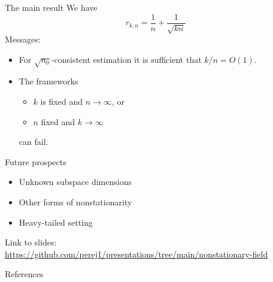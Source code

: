 \documentclass{beamer}
\begin{document}
\begin{frame}{The main result}
  We have
  \begin{equation*}
    r_{k,n} = \frac{1}{n} + \frac{1}{\sqrt{kn}}
  \end{equation*}
  \pause
  Messages:
  \begin{itemize}
    \item For $\sqrt{n_0}$-consistent estimation it is sufficient that
    $k/n=O(1)$.
    \pause
    \item The frameworks
    \begin{itemize}
    \item $k$ is fixed and $n\to\infty$, or
    \item $n$ fixed and $k\to\infty$
  \end{itemize}
  \pause
  can fail.
  \end{itemize}
\end{frame}


\begin{frame}{Future prospects}
  \begin{itemize}
    \item Unknown subspace dimensions
    \item Other forms of nonstationarity
    \item Heavy-tailed setting
  \end{itemize}
\end{frame}


\begin{frame}
  Link to slides:
  \url{https://github.com/perej1/presentations/tree/main/nonstationary-field}
\end{frame}


\begin{frame}[allowframebreaks]{References}
  \printbibliography
\end{frame}
\end{document}
